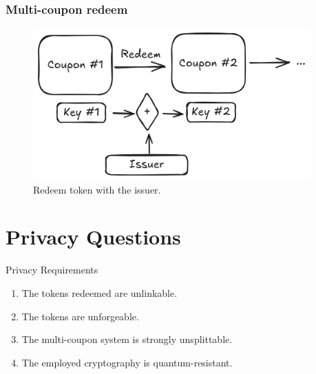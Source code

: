 \documentclass[presentation]{beamer}
\begin{document}
\begin{frame}
  \frametitle{Multi-coupon redeem}
\begin{figure}
  \begin{center}
    \includegraphics[width=0.95\textwidth]{redeem-token}
  \end{center}
  \caption{Redeem token with the issuer.}\label{fig:redeem-token}
\end{figure}
\end{frame}

\section{Privacy Questions}
\begin{frame}{Privacy Requirements}
 \begin{enumerate}
   \item The tokens redeemed are \alert{unlinkable}.
   \item The tokens are \alert{unforgeable}.
   \item The multi-coupon system is \alert{strongly unsplittable}.
   \item The employed cryptography is \alert{quantum-resistant}.
 \end{enumerate}
\end{frame}
\end{document}

